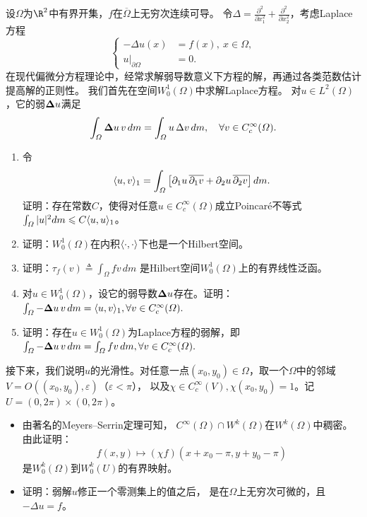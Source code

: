 \begin{2}
设$\varOmega$为$\R^2$中有界开集，$f$在$\overline{\varOmega}$上无穷次连续可导。
令$\Delta=\frac{\partial^2}{\partial x_1^2}+\frac{\partial^2}{\partial x_2^2}$，考虑Laplace方程
\[\left\{\begin{aligned}
    -\Delta u(x)&=f(x),\ x\in\varOmega,\\
    u|_{\partial\varOmega}&=0.
\end{aligned}\right.\]
在现代偏微分方程理论中，经常求解弱导数意义下方程的解，再通过各类范数估计提高解的正则性。
我们首先在空间$W_0^1(\varOmega)$中求解Laplace方程。
对$u\in L^2(\varOmega)$，它的弱$\mathbf{\Delta} u$满足
$$\int_\varOmega\mathbf{\Delta} u\,v\,dm=\int_\varOmega u\,\Delta v\,dm,
\quad\forall v\in C_c^\infty(\varOmega).$$
\begin{enumerate}[label=(\roman*)]
\item 令
$$\langle u,v\rangle_1=\int_\varOmega\big[\mathbf{\partial}_1u\,\overline{\mathbf{\partial}_1v}
+\mathbf{\partial}_2u\,\overline{\mathbf{\partial}_2v}\big]\,dm.$$
证明：存在常数$C$，使得对任意$u\in C_c^\infty(\varOmega)$成立Poincaré不等式
$\int_\varOmega|u|^2dm\leqslant C\langle u,u\rangle_1$。
\item 证明：$W_0^1(\varOmega)$在内积$\langle\cdot,\cdot\rangle$下也是一个Hilbert空间。
\item 证明：$\tau_f(v)\triangleq\int_\varOmega fv\,dm$
是Hilbert空间$W_0^1(\varOmega)$上的有界线性泛函。
\item 对$u\in W_0^1(\varOmega)$，设它的弱导数$\mathbf{\Delta} u$存在。证明：
$\int_\varOmega-\mathbf{\Delta} u\,v\,dm=\langle u,v\rangle_1,\forall v\in C_c^\infty(\varOmega).$
\item 证明：存在$u\in W_0^1(\varOmega)$为Laplace方程的弱解，即
$\int_\varOmega-\mathbf{\Delta} u\,v\,dm=\int_\varOmega fv\,dm,\forall v\in C_c^\infty(\varOmega).$
\end{enumerate}
接下来，我们说明$u$的光滑性。对任意一点$(x_0,y_0)\in\varOmega$，取一个$\varOmega$中的邻域
$V=O((x_0,y_0),\varepsilon)$（$\varepsilon<\pi$），
以及$\chi\in C_c^\infty(V),\chi(x_0,y_0)=1$。记$U=(0,2\pi)\times(0,2\pi)$。
\begin{itemize}
\item[(vi)] 由著名的Meyers--Serrin定理可知，
$C^\infty(\varOmega)\cap W^k(\varOmega)$在$W^k(\varOmega)$中稠密。由此证明：
$$f(x,y)\mapsto(\chi f)(x+x_0-\pi,y+y_0-\pi)$$
是$W_0^k(\varOmega)$到$W_0^k(U)$的有界映射。

\item[(vii)] 证明：弱解$u$修正一个零测集上的值之后，
是在$\varOmega$上无穷次可微的，且$-\Delta u=f$。
\end{itemize}
\end{2}

